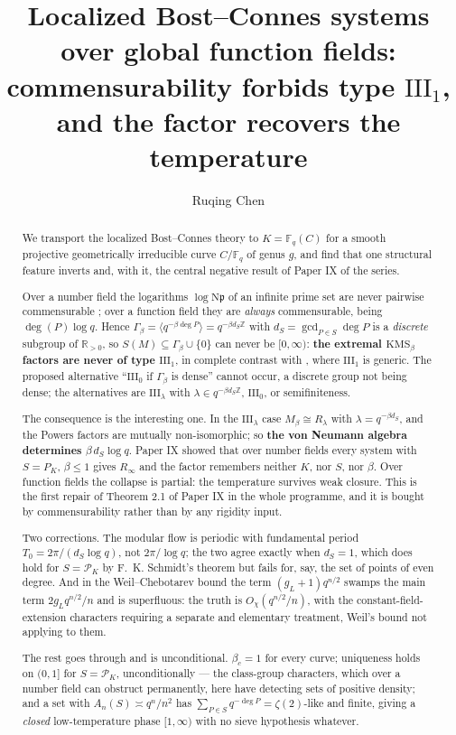 \documentclass[11pt]{amsart}
\title[Bost--Connes systems over function fields]{Localized Bost--Connes systems over global function fields:\\ commensurability forbids type $\mathrm{III}_1$,\\ and the factor recovers the temperature}
\author{Ruqing Chen}
\date{}
\numberwithin{equation}{section}
\theoremstyle{definition}
\theoremstyle{remark}
\newcommand{\Z}{\mathbb{Z}}
\newcommand{\R}{\mathbb{R}}
\newcommand{\F}{\mathbb{F}}
\newcommand{\cP}{\mathcal{P}}
\newcommand{\pp}{\mathfrak{p}}
\newcommand{\Ns}{\mathrm{N}}
\begin{document}
\begin{abstract}
We transport the localized Bost--Connes theory to $K=\F_q(C)$ for a smooth projective
geometrically irreducible curve $C/\F_q$ of genus $g$, and find that one structural feature
inverts and, with it, the central negative result of Paper IX of the series.

Over a number field the logarithms $\log\Ns\pp$ of an infinite prime set are never pairwise
commensurable \cite[Lem.~4.1]{SeriesI}; over a function field they are \emph{always}
commensurable, being $\deg(P)\log q$. Hence
$\Gamma_\beta=\langle q^{-\beta\deg P}\rangle=q^{-\beta d_S\Z}$ with
$d_S=\gcd_{P\in S}\deg P$ is a \emph{discrete} subgroup of $\R_{>0}$, so
$S(M)\subseteq\Gamma_\beta\cup\{0\}$ can never be $[0,\infty)$: \textbf{the extremal
$\mathrm{KMS}_\beta$ factors are never of type $\mathrm{III}_1$}, in complete contrast with
\cite[Thm.~3.2]{SeriesI}, where $\mathrm{III}_1$ is generic. The proposed alternative
``$\mathrm{III}_0$ if $\Gamma_\beta$ is dense'' cannot occur, a discrete group not being
dense; the alternatives are $\mathrm{III}_\lambda$ with $\lambda\in q^{-\beta d_S\Z}$,
$\mathrm{III}_0$, or semifiniteness.

The consequence is the interesting one. In the $\mathrm{III}_\lambda$ case
$M_\beta\cong R_\lambda$ with $\lambda=q^{-\beta d_S}$, and the Powers factors are mutually
non-isomorphic; so \textbf{the von Neumann algebra determines $\beta\,d_S\log q$}. Paper IX
showed that over number fields every system with $S=P_K$, $\beta\le1$ gives $R_\infty$ and the
factor remembers neither $K$, nor $S$, nor $\beta$. Over function fields the collapse is
partial: the temperature survives weak closure. This is the first repair of Theorem 2.1 of
Paper IX in the whole programme, and it is bought by commensurability rather
than by any rigidity input.

Two corrections. The modular flow is periodic with fundamental period
$T_0=2\pi/(d_S\log q)$, not $2\pi/\log q$; the two agree exactly when $d_S=1$, which does hold
for $S=\cP_K$ by F.~K. Schmidt's theorem but fails for, say, the set of points of even degree.
And in the Weil--Chebotarev bound the term $(g_L+1)q^{n/2}$ swamps the main term
$2g_Lq^{n/2}/n$ and is superfluous: the truth is $O_\chi(q^{n/2}/n)$, with the
constant-field-extension characters requiring a separate and elementary treatment, Weil's
bound not applying to them.

The rest goes through and is unconditional. $\beta_c=1$ for every curve; uniqueness holds on
$(0,1]$ for $S=\cP_K$, unconditionally --- the class-group characters, which over a number
field can obstruct permanently, here have detecting sets of positive density; and a set with
$A_n(S)\asymp q^n/n^2$ has $\sum_{P\in S}q^{-\deg P}=\zeta(2)$-like and finite, giving a
\emph{closed} low-temperature phase $[1,\infty)$ with no sieve hypothesis whatever.
\end{abstract}
\end{document}
